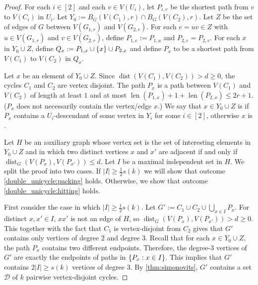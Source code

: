 \documentclass{patmorin}
\newcommand{\piotr}[1]{\textcolor{red}{Piotr: #1}}
\DeclareMathOperator{\len}{len}
\DeclareMathOperator{\dist}{dist}
\DeclarePairedDelimiter\set{\{}{\}}
\renewcommand{\mid}{:}  %
\begin{document}
\begin{proof}
    For each $i\in[2]$ and each $v\in V(U_i)$, let $P_{i,v}$ be the shortest path from $v$ to $V(C_i)$ in $U_i$.
    Let $Y_0:=B_G(V(C_1),r)\cap B_G(V(C_2),r)$.
    Let $Z$ be the set of edges of $G$ between $V(G_{1,r})$ and $V(G_{2,r})$.
    For each $e=uv\in Z$ with $u\in V(G_{1,r})$ and $v\in V(G_{2,r})$, define $P_{1,e}:=P_{1,u}$ and $P_{2,e}=P_{2,v}$.
    For each $x$ in $Y_0\cup Z$, define
    $Q_x:=P_{1,x}\cup\set{x}\cup P_{2,x}$ and define $P_x$ to be a shortest path from $V(C_1)$ to $V(C_2)$ in $Q_x$.

    Let $x$ be an element of $Y_0\cup Z$.  Since $\dist(V(C_1),V(C_2))>d\ge 0$, the cycles $C_1$ and $C_2$ are vertex disjoint.  The path $P_x$ is a path between $V(C_1)$ and $V(C_2)$ of length at least $1$ and at most $\len(P_{1,x})+1+\len(P_{2,x})\le 2r+1$.  ($P_x$ does not necessarily contain the vertex/edge $x$.)
    We say that $x\in Y_0\cup Z$ is  if $P_x$ contains a $U_i$-descendant of some vertex in $Y_i$ for some $i\in[2]$,  otherwise $x$ is .

    Let $H$ be an auxiliary graph whose vertex set is the set of interesting elements in $Y_0\cup Z$ and in which two distinct vertices $x$ and $x'$ are adjacent if and only if $\dist_G(V(P_x),V(P_{x'}))\leq d$.
    Let $I$ be a maximal independent set in $H$.
    We split the proof into two cases.  If
    $|I|\geq \frac{1}{2}s(k)$ we will show that outcome \cref{double_unicycle:packing} holds.  Otherwise, we show that outcome \cref{double_unicycle:hitting} holds.

    First consider the case in which $|I|\ge\tfrac{1}{2}s(k)$.
    Let $G':=C_1\cup C_2\cup\bigcup_{x\in I}P_x$.
    For distinct $x,x'\in I$, $xx'$ is not an edge of $H$, so $\dist_G(V(P_x),V(P_{x'}))>d\ge 0$.
    This together with the fact that $C_1$ is vertex-disjoint from $C_2$ gives that $G'$ contains only vertices of degree $2$ and degree $3$.
    Recall that for each $x\in Y_0\cup Z$, the path $P_x$ contains two different endpoints.
    Therefore, the degree-$3$ vertices of $G'$ are exactly the endpoints of paths in $\set{P_x\mid x\in I}$.
    This implies that $G'$ contains $2|I|\geq s(k)$ vertices of degree $3$.
    By \cref{thm:simonovits}, $G'$ contains a set $\mathcal{D}$ of $k$ pairwise vertex-disjoint cycles.


\end{proof}
\end{document}
